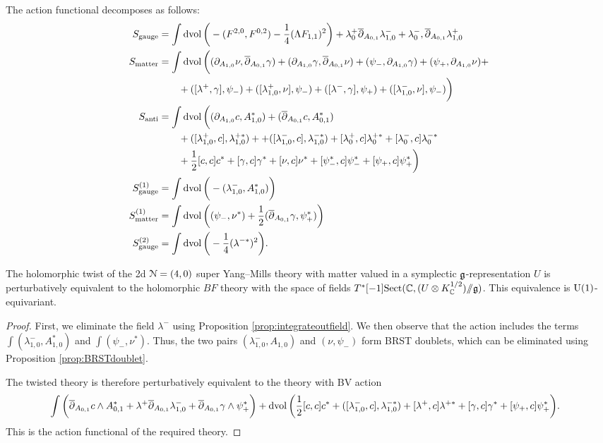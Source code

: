\documentclass[10pt, oneside]{article}
\begin{document}
The action functional decomposes as follows:
\begin{align*}
S_{\mathrm{gauge}} &= \int \operatorname{dvol} \bigg(-(F^{2, 0}, F^{0, 2}) - \frac{1}{4}(\Lambda F_{1, 1})^2 \bigg) + \lambda^+_0  \overline{\partial}_{A_{0,1}} \lambda^-_{1,0} + \lambda^-_{0} , \overline{\partial}_{A_{0,1}} \lambda^+_{1,0}    \\
S_{\mathrm{matter}} &= \int \operatorname{dvol} \bigg( (\partial_{A_{1,0}} \nu , \overline{\partial}_{A_{0,1}} \gamma) + (\partial_{A_{1,0}}\gamma, \overline{\partial}_{A_{0,1}} \nu) + (\psi_- , \partial_{A_{1,0}} \gamma) + (\psi_+ , \partial_{A_{1,0}} \nu)  + \\
& \qquad + ([\lambda^+, \gamma], \psi_-) + ([\lambda_{1,0}^+, \nu], \psi_-) + ([\lambda^-, \gamma], \psi_+) + ([\lambda^-_{1,0}, \nu], \psi_-) \bigg) \\
S_{\mathrm{anti}} &= \int \operatorname{dvol} \bigg( (\partial_{A_{1, 0}} c , A_{1,0}^*) + (\overline{\partial}_{A_{0, 1}} c, A_{0,1}^*) \\ & \qquad + ([\lambda^+_{1,0}, c], \lambda_{1,0}^{+*}) + + ([\lambda^-_{1,0}, c], \lambda_{1,0}^{-*}) +  [\lambda^+_{0}, c] \lambda_{0}^{+*}+ [\lambda^-_{0}, c] \lambda_{0}^{-*}\\
&\qquad + \frac{1}{2}[c, c]c^* + [\gamma, c] \gamma^* + [\nu, c] \nu^* + [\psi_-^*, c] \psi_-^* + [\psi_+, c] \psi_+^*\bigg) \\
S^{(1)}_{\mathrm{gauge}} &=  \int \operatorname{dvol} \bigg( - (\lambda^-_{1,0}, A_{1,0}^*) \bigg) \\
S^{(1)}_{\mathrm{matter}} &=  \int \operatorname{dvol} \bigg( (\psi_{-}, \nu^*) + \frac 12(\overline{\partial}_{A_{0,1}} \gamma, \psi_+^*) \bigg)\\
S^{(2)}_{\mathrm{gauge}} &= \int \operatorname{dvol} \bigg( -\frac{1}{4} (\lambda^{-*})^2 \bigg) .
\end{align*}


\begin{theorem} \label{thm:2d(4,0)}
The holomorphic twist of the 2d $\mathcal N=(4,0)$ super Yang--Mills theory with matter valued in a symplectic $\mathfrak g$-representation $U$ is perturbatively equivalent to the holomorphic $BF$ theory with the space of fields $T^*[-1] \mathrm{Sect}(\mathbb C , (U \otimes K^{1/2}_{\mathbb C}) /\!\!/ \mathfrak g)$. This equivalence is $\mathrm{U}(1)$-equivariant.
\end{theorem}

\begin{proof}
First, we eliminate the field $\lambda^-$ using Proposition \ref{prop:integrateoutfield}.  
We then observe that the action includes the terms $\int  (\lambda^-_{1,0} , A_{1,0}^*)$ and  $\int (\psi_-, \nu^*)$.  
Thus, the two pairs $(\lambda^-_{1,0}, A_{1,0})$ and $(\nu, \psi_-)$ form BRST doublets, 
which can be eliminated using Proposition \ref{prop:BRSTdoublet}.  

The twisted theory is therefore perturbatively equivalent to the theory with BV action 
\begin{align*}
& \int \bigg(\overline{\partial}_{A_{0,1}} c \wedge A_{0,1}^* + \lambda^+ \overline{\partial}_{A_{0,1}} \lambda^-_{1,0} + \overline{\partial}_{A_{0,1}} \gamma \wedge \psi_+^* \bigg) + \operatorname{dvol} \bigg( \frac{1}{2}[c, c]c^*+ ([\lambda_{1,0}^-, c] , \lambda_{1,0}^{-*}) + [\lambda^+, c] \lambda^{+*} + [\gamma, c] \gamma^* + [\psi_+, c] \psi_+^* \bigg).
\end{align*}
This is the action functional of the required theory.
\end{proof}
\end{document}
